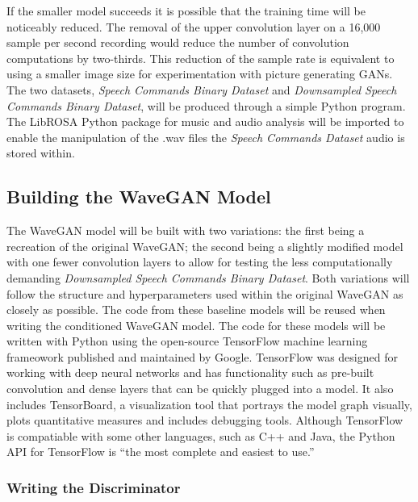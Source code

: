 \documentclass[a4paper, dvipsnames, titlepage]{article}
\begin{document}
If the smaller model succeeds it is possible that the training time will be noticeably reduced.
The removal of the upper convolution layer on a 16,000 sample per second recording would reduce the number of convolution computations by two-thirds.
This reduction of the sample rate is equivalent to using a smaller image size for experimentation with picture generating GANs.
\newline
\newline
The two datasets, \textit{Speech Commands Binary Dataset} and \textit{Downsampled Speech Commands Binary Dataset}, will be produced through a simple Python program.
The LibROSA Python package for music and audio analysis will be imported to enable the manipulation of the .wav files the \textit{Speech Commands Dataset} audio is stored within.

\subsection{Building the WaveGAN Model}

The WaveGAN model will be built with two variations: the first being a recreation of the original WaveGAN; the second being a slightly modified model with one fewer convolution layers to allow for testing the less computationally demanding \textit{Downsampled Speech Commands Binary Dataset}.
Both variations will follow the structure and hyperparameters used within the original WaveGAN as closely as possible.
The code from these baseline models will be reused when writing the conditioned WaveGAN model.
\newline
\newline
The code for these models will be written with Python using the open-source TensorFlow machine learning frameowork published and maintained by Google.
TensorFlow was designed for working with deep neural networks and has functionality such as pre-built convolution and dense layers that can be quickly plugged into a model.
It also includes TensorBoard, a visualization tool that portrays the model graph visually, plots quantitative measures and includes debugging tools.
Although TensorFlow is compatiable with some other languages, such as C++ and Java, the Python API for TensorFlow is ``the most complete and easiest to use.'' \cite{TensorFlowAPI}

\subsubsection{Writing the Discriminator}
\end{document}
